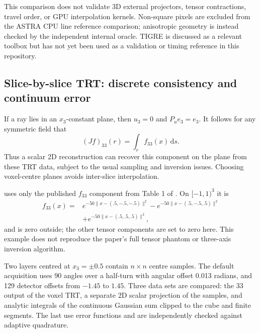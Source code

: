 \documentclass[11pt,a4paper]{article}
\newcommand{\dd}{\,\mathrm{d}}
\newcommand{\code}[1]{\texttt{\detokenize{#1}}}
\begin{document}
This comparison does not validate 3D external projectors, tensor
contractions, travel order, or GPU interpolation kernels. Non-square
pixels are excluded from the ASTRA CPU line reference comparison;
anisotropic geometry is instead checked by the independent internal oracle.
TIGRE is discussed as a relevant toolbox but has not yet been used as a
validation or timing reference in this repository.

\subsection{Slice-by-slice TRT: discrete consistency and continuum error}
\label{sec:slices}
If a ray lies in an $x_3$-constant plane, then $u_3=0$ and $P_ue_3=e_3$.
It follows for any symmetric field that
\begin{equation}
 (Jf)_{33}(r)=\int_r f_{33}(x)\dd s.
\end{equation}
Thus a scalar 2D reconstruction can recover this component on the plane
from these TRT data, subject to the usual sampling and inversion issues.
Choosing voxel-centre planes avoids inter-slice interpolation.

\code{examples/trt_slices.py} uses only the published $f_{33}$ component
from Table 1 of \citet{desai2016}. On $[-1,1)^3$ it is
\begin{align}
 f_{33}(x)={}&e^{-50\lVert x-(.5,-.5,-.5)\rVert^2}
              -e^{-50\lVert x-(.5,-.5,.5)\rVert^2}\nonumber\\
            &+e^{-50\lVert x-(.5,.5,.5)\rVert^2},
\end{align}
and is zero outside; the other tensor components are set to zero here.
This example does not reproduce the paper's full tensor phantom or
three-axis inversion algorithm.

Two layers centred at $x_3=\pm0.5$ contain $n\times n$ centre samples.
The default acquisition uses 90 angles over a half-turn with angular
offset 0.013 radians, and 129 detector offsets from $-1.45$ to $1.45$.
Three data sets are compared: the $33$ output of the voxel TRT, a separate
2D scalar projection of the samples, and analytic integrals of the
continuous Gaussian sum clipped to the cube and finite segments. The last
use error functions and are independently checked against adaptive
quadrature.
\end{document}
